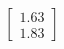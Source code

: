 \documentclass[preview]{standalone}
\begin{document}
\begin{align*}
\begin{bmatrix} 1.63 \\ 1.83 \end{bmatrix}
\end{align*}
\end{document}
